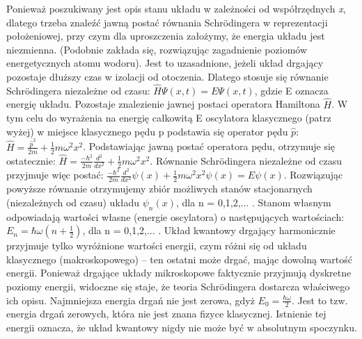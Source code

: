 Ponieważ poszukiwany jest opis stanu układu w zależności od współrzędnych \textit{x}, dlatego trzeba znaleźć jawną postać równania Schrödingera w reprezentacji położeniowej, przy czym dla uproszczenia założymy, że energia układu jest niezmienna. (Podobnie zakłada się, rozwiązując zagadnienie poziomów energetycznych atomu wodoru). Jest to uzasadnione, jeżeli układ drgający pozostaje dłuższy czas w izolacji od otoczenia. Dlatego stosuje się równanie Schrödingera niezależne od czasu:\newline
$ \hat{H}\Psi(x,t) = E\Psi(x,t)$,\newline
gdzie E oznacza energię układu. Pozostaje znalezienie jawnej postaci operatora Hamiltona $ \hat{H}$. W tym celu do wyrażenia na energię całkowitą E oscylatora klasycznego (patrz wyżej) w miejsce klasycznego pędu p podstawia się operator pędu $ \hat{p} $:\newline
$ \hat{H} = \frac{\hat{p}^2}{2m} + \frac{1}{2}m\omega^2x^2 $.\newline
Podstawiając jawną postać operatora pędu, otrzymuje się ostatecznie:\newline
$ \hat{H} = \frac{-\hbar^2}{2m}\frac{d^2}{dx^2} + \frac{1}{2}m\omega^2x^2 $.\newline
Równanie Schrödingera niezależne od czasu przyjmuje więc postać:\newline
$ \frac{-\hbar^2}{2m}\frac{d^2}{dx^2}\psi(x) + \frac{1}{2}m\omega^2x^2\psi(x) = E\psi(x) $.\newline
Rozwiązując powyższe równanie otrzymujemy zbiór możliwych stanów stacjonarnych (niezależnych od czasu) układu $ \psi_n(x) $, dla n = 0,1,2,... . Stanom własnym odpowiadają wartości własne (energie oscylatora) o następujących wartościach:\newline
$ E_n = \hbar\omega(n + \frac{1}{2}) $, dla n = 0,1,2,... .\newline
Układ kwantowy drgający harmonicznie przyjmuje tylko wyróżnione wartości energii, czym różni się od układu klasycznego (makroskopowego) – ten ostatni może drgać, mając dowolną wartość energii. Ponieważ drgające układy mikroskopowe faktycznie przyjmują dyskretne poziomy energii, widoczne się staje, że teoria Schrödingera dostarcza właściwego ich opisu. Najmniejsza energia drgań nie jest zerowa, gdyż $ E_0 = \frac{\hbar\omega}{2} $. Jest to tzw. energia drgań zerowych, która nie jest znana fizyce klasycznej. Istnienie tej energii oznacza, że układ kwantowy nigdy nie może być w absolutnym spoczynku. 